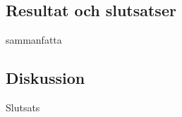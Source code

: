 \documentclass[11pt]{article}
\begin{document}
\begin{flushleft}
\section{Resultat och slutsatser}
sammanfatta

\subsection{Diskussion}
Slutsats


\setcounter{secnumdepth}{0}
\pagebreak


\printbibliography










\setcounter{secnumdepth}{2}
\end{flushleft}
\end{document}
